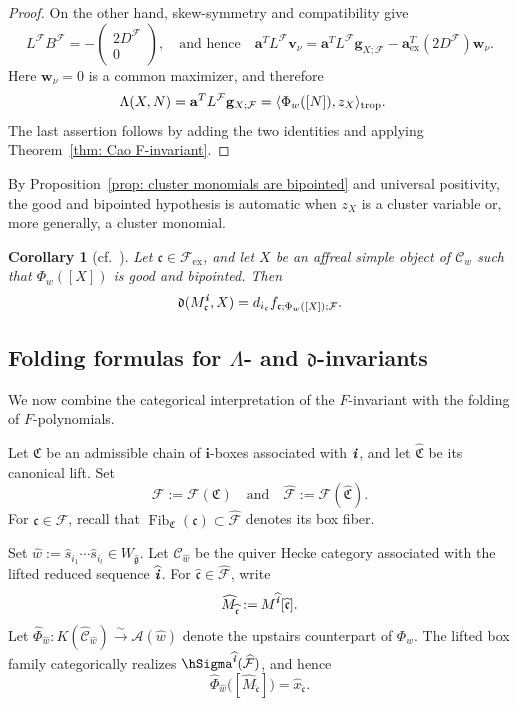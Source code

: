 \documentclass[12pt, leqno]{amsart}
\numberwithin{equation}{section}
\theoremstyle{plain}
\newtheorem{corollary}[lemma]{Corollary}
\theoremstyle{definition}
\newcommand{\seteq}{\mathbin{:=}}
\newcommand{\ex}{\mathrm{ex}}
\newcommand{\g}{\mathfrak{g}}
\newcommand{\trop}{{\rm trop}}
\newcommand{\de}{\mathfrak{d}}
\newcommand{\ii}{ \textbf{\textit{i}}}
\newcommand{\Fib}{\operatorname{Fib}}
\newcommand{\hM}{\widehat{M}}
\newcommand{\hg}{{\widehat{\g}}}
\newcommand{\hs}{\widehat{s}}
\newcommand{\hw}{\widehat{w}}
\newcommand{\hx}{\widehat{x}}
\newcommand{\hii}{{\widehat{\ii}}}
\newcommand{\frakC}{\mathfrak{C}}
\newcommand{\frakc}{\mathfrak{c}}
\newcommand{\hfrakC}{\widehat{\frakC}}
\newcommand{\hfrakc}{\widehat{\frakc}}
\newcommand{\bfa}{\mathbf{a}}
\newcommand{\bfg}{\mathbf{g}}
\newcommand{\bfi}{\mathbf{i}}
\newcommand{\bfv}{\mathbf{v}}
\newcommand{\bfw}{\mathbf{w}}
\newcommand{\calA}{\mathcal{A}}
\newcommand{\calF}{\mathcal{F}}
\newcommand{\hcalF}{{\widehat{\calF}}}
\newcommand{\scrC}{\mathscr{C}}
\newcommand{\qtq}[1][{and}]{\quad\text{{#1}}\quad}
\newcommand{\qtqh}[1][{and hence}]{\quad\text{{#1}}\quad}
\begin{document}
\begin{proof}
On the other hand, skew-symmetry and compatibility give
\[
L^\calF B^\calF
=
-\begin{pmatrix}2D^\calF\\0\end{pmatrix},
\qtqh
\bfa^TL^\calF\bfv_\nu
=
\bfa^TL^\calF\bfg_{X;\calF}
-\bfa_{\ex}^T(2D^\calF)\bfw_\nu.
\]
Here \(\bfw_\nu=0\) is a common maximizer, and therefore
\begin{align}\label{eq: Lambda X N as tropical invariant}
\Lambda(X,N)
&=
\bfa^TL^\calF\bfg_{X;\calF}
=
\langle\Phi_w([N]),z_X\rangle_{\trop}.
\end{align}
The last assertion follows by adding the two identities and applying Theorem~\ref{thm: Cao F-invariant}.
\end{proof}

By Proposition~\ref{prop: cluster monomials are bipointed} and
universal positivity, the good and bipointed hypothesis is
automatic when \(z_X\) is a cluster variable or, more generally,
a cluster monomial.

\begin{corollary}[{cf.~\cite[Proposition~4.13]{Cao23}}]
\label{cor: d-invariant from f-vector}
Let \(\frakc\in\calF_{\ex}\), and let \(X\) be an affreal
simple object of \(\scrC_w\) such that \(\Phi_w([X])\) is good
and bipointed.  Then
\[
\de(M_\frakc^\ii,X)
=
d_{i_\frakc}f_{\frakc;\Phi_w([X]);\calF}.
\]
\end{corollary}




 

\subsection{Folding formulas for
\texorpdfstring{\(\Lambda\)}{Lambda}- and
\texorpdfstring{\(\de\)}{d}-invariants}
\label{subsec: categorical folding formulas}

We now combine the categorical interpretation of the
\(F\)-invariant with the folding of \(F\)-polynomials.

Let \(\frakC\) be an admissible chain of \(\bfi\)-boxes associated
with \(\ii\), and let $\hfrakC$
be its canonical lift.  Set
\[
\calF\seteq\calF(\frakC) \qtq \hcalF\seteq\calF(\hfrakC).
\]
For \(\frakc\in\calF\), recall that $\Fib_{\frakC}(\frakc) \subset\hcalF$ 
denotes its box fiber.

Set
$\hw \seteq \hs_{i_1}\cdots\hs_{i_l}\in W_\hg$.
Let $\widehat{\scrC}_{\hw}$ be the quiver Hecke category associated with the lifted reduced
sequence \(\hii\).  For
\(\hfrakc\in\hcalF\), write
\[
\hM_{\hfrakc} \seteq M^\hii[\hfrakc].
\]
Let
$\widehat\Phi_{\hw}: K(\widehat{\scrC}_{\hw}) \xrightarrow{\sim} \calA(\hw)$
denote the upstairs counterpart of \(\Phi_w\).  The lifted box family categorically realizes
\(\hSigma^\hii(\hcalF)\), and hence
\[
\widehat\Phi_{\hw} \bigl([\hM_{\hfrakc}]\bigr) = \hx_{\hfrakc}.
\]
\end{document}
